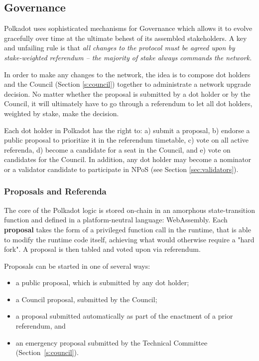 \subsection{Governance}\label{sec:governance}

Polkadot uses sophisticated mechanisms for Governance which allows it to evolve gracefully over time at the ultimate behest of its assembled stakeholders. A key and unfailing rule is that \emph{all changes to the protocol must be agreed upon by stake-weighted referendum -- the majority of stake always commands the network.}

In order to make any changes to the network, the idea is to compose dot holders and the Council (Section \ref{s:council}) together to administrate a network upgrade decision. No matter whether the proposal is submitted by a dot holder or by the Council, it will ultimately have to go through a referendum to let all dot holders, weighted by stake, make the decision.

Each dot holder in Polkadot has the right to: a) submit a proposal, b) endorse a public proposal to prioritize it in the referendum timetable, c) vote on all active referenda, d) become a candidate for a seat in the Council, and e) vote on candidates for the Council. In addition, any dot holder may become a nominator or a validator candidate to participate in NPoS (see Section \ref{sec:validators}).

\subsubsection{Proposals and Referenda}

The core of the Polkadot logic is stored on-chain in an amorphous state-transition function and defined in a platform-neutral language: WebAssembly. Each \textbf{proposal} takes the form of a privileged function call in the runtime, that is able to modify the runtime code itself, achieving what would otherwise require a "hard fork". A proposal is then tabled and voted upon via referendum. 

Proposals can be started in one of several ways:
\begin{itemize}
\item a public proposal, which is submitted by any dot holder;
\item a Council proposal, submitted by the Council;
\item a proposal submitted automatically as part of the enactment of a prior referendum, and
\item an emergency proposal submitted by the Technical Committee (Section~\ref{s:council}).
\end{itemize} 

